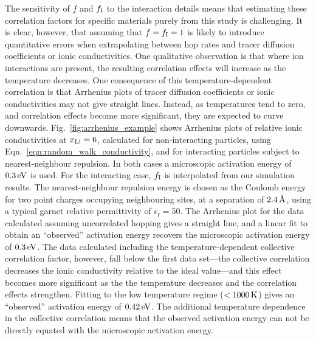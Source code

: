 \documentclass[aps,prb,twocolumn,superscriptaddress,reprint]{revtex4-1}
\newcommand{\xLi}{x_\m{Li}}
\newcommand{\angstrom}{\mbox{\normalfont\AA}}
\begin{document}
The sensitivity of $f$ and $f_{\mathrm{I}}$ to the interaction details means that estimating these correlation factors for specific materials purely from this study is challenging. It is clear, however, that assuming that $f=f_{\mathrm{I}}=1$ is likely to introduce quantitative errors when extrapolating between hop rates and tracer diffusion coefficients or ionic conductivities. One qualitative observation is that where ion interactions are present, the resulting correlation effects will increase as the temperature decreases. One consequence of this temperature-dependent correlation is that Arrhenius plots of tracer diffusion coefficients or ionic conductivities may not give  straight lines. Instead, as temperatures tend to zero, and correlation effects become more significant, they are expected to curve downwards. Fig.~\ref{fig:arrhenius_example} shows Arrhenius plots of relative ionic conductivities at $\xLi=6$, calculated for non-interacting particles, using Eqn.~\ref{eqn:random_walk_conductivity}, and for interacting particles subject to nearest-neighbour repulsion. In both cases a microscopic activation energy of $0.3\,\mathrm{eV}$ is used. For the interacting case, $f_{\mathrm{I}}$ is interpolated from our simulation results. The nearest-neighbour repulsion energy is chosen as the Coulomb energy for two point charges occupying neighbouring sites, at a separation of $2.4\u{\angstrom}$, using a typical garnet relative permittivity of $\epsilon_\mathrm{r}=50$.\cite{RettenwanderEtAl_InorgChem2015} The Arrhenius plot for the data calculated assuming uncorrelated hopping gives a straight line, and a linear fit to obtain an ``observed'' activation energy recovers the microscopic activation energy of $0.3\,\mathrm{eV}$. The data calculated including the temperature-dependent collective correlation factor, however, fall below the first data set---the collective correlation decreases the ionic conductivity relative to the ideal value---and this effect becomes more significant as the  the temperature decreases and the correlation effects strengthen. Fitting to the low temperature regime ($<1000\,\mathrm{K}$) gives an ``observed'' activation energy of $0.42\,\mathrm{eV}$. The additional temperature dependence in the collective correlation means that the observed activation energy can not be directly equated with the microscopic activation energy.
\end{document}
